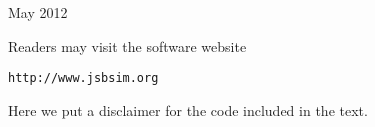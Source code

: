 %
\bigskip

\begin{flushright}
May 2012
\end{flushright}

\vfill
\medskip

{\footnotesize\noindent Readers may visit the software website

\smallskip
\texttt{http://www.jsbsim.org}

\smallskip\noindent
Here we put a disclaimer for the code included in the text.\par}
